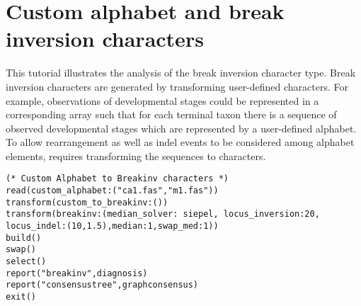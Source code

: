 \section{Custom alphabet and break inversion characters}{\label{tutorial 8}}

This tutorial illustrates the analysis of the break inversion character type.  Break inversion characters are generated by transforming user-defined  characters.  
For example, observations of developmental stages could be represented in a corresponding array such that for each terminal taxon there is a sequence of observed developmental stages which are represented by a user-defined alphabet.  To allow rearrangement as well as indel events to be considered among alphabet elements, requires transforming the  sequences to  characters. 

\begin{verbatim}
(* Custom Alphabet to Breakinv characters *)
read(custom_alphabet:("ca1.fas","m1.fas"))
transform(custom_to_breakinv:())
transform(breakinv:(median_solver: siepel, locus_inversion:20, 
locus_indel:(10,1.5),median:1,swap_med:1))
build()
swap()
select()
report("breakinv",diagnosis)
report("consensustree",graphconsensus)
exit()
\end{verbatim}

